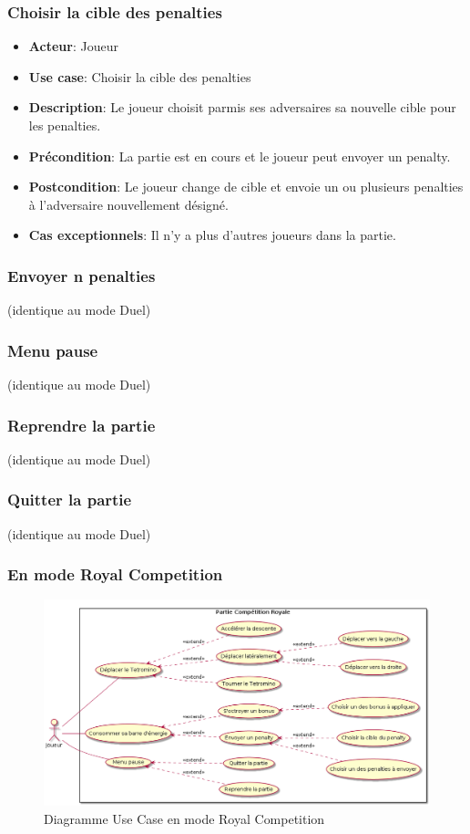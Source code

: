 \documentclass{article}
\begin{document}
\subsubsection*{Choisir la cible des penalties}
\begin{itemize}
    \item \textbf{Acteur}: Joueur
    \item \textbf{Use case}: Choisir la cible des penalties
    \item \textbf{Description}: Le joueur choisit parmis ses adversaires sa nouvelle cible pour les penalties.
    \item \textbf{Précondition}: La partie est en cours et le joueur peut envoyer un penalty.
    \item \textbf{Postcondition}: Le joueur change de cible et envoie un ou plusieurs penalties à l’adversaire nouvellement désigné.
    \item \textbf{Cas exceptionnels}: Il n'y a plus d'autres joueurs dans la partie.
\end{itemize}

\subsubsection*{Envoyer n penalties} (identique au mode Duel)

\subsubsection*{Menu pause} (identique au mode Duel)
\subsubsection*{Reprendre la partie} (identique au mode Duel)
\subsubsection*{Quitter la partie} (identique au mode Duel)

\subsubsection{En mode Royal Competition}

\begin{figure}[!h]
    \centering
    \includegraphics[width=1\textwidth]{../res/uml/usecase/RoyalUseCase.png}
    \caption{Diagramme Use Case en mode Royal Competition}
    \label{fig:Royal-Competition}
\end{figure}
\end{document}
